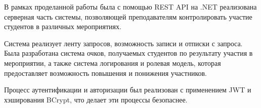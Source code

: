 \conclusion
В рамках проделанной работы была с помощью REST API на .NET реализована серверная часть системы, позволяющей преподавателям контролировать участие студентов в различных мероприятиях.

Система реализует ленту запросов, возможность записи и отписки с запроса. Была разработана система очков, получаемых студентов по результату участия в мероприятии, а также система логирования и ролевая модель, которая предоставляет возможность повышения и понижения участников.

Процесс аутентификации и авторизации был реализован с применением JWT и хэширования BCrypt, что делает эти процессы безопаснее.
